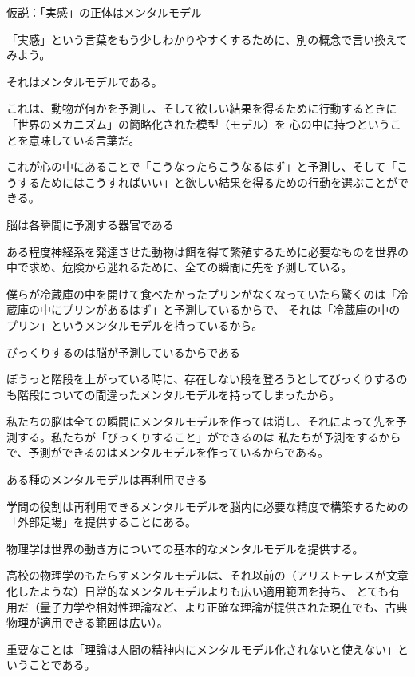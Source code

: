 \documentclass[12pt, unicode]{beamer}
\begin{document}
\begin{frame}{仮説：「実感」の正体はメンタルモデル}

「実感」という言葉をもう少しわかりやすくするために、別の概念で言い換えてみよう。

それはメンタルモデルである。

これは、動物が何かを予測し、そして欲しい結果を得るために行動するときに「世界のメカニズム」の簡略化された模型（モデル）を
心の中に持つということを意味している言葉だ。

これが心の中にあることで「こうなったらこうなるはず」と予測し、そして「こうするためにはこうすればいい」と欲しい結果を得るための行動を選ぶことができる。

\end{frame}

\begin{frame}{脳は各瞬間に予測する器官である}

ある程度神経系を発達させた動物は餌を得て繁殖するために必要なものを世界の中で求め、危険から逃れるために、全ての瞬間に先を予測している。

僕らが冷蔵庫の中を開けて食べたかったプリンがなくなっていたら驚くのは「冷蔵庫の中にプリンがあるはず」と予測しているからで、
それは「冷蔵庫の中のプリン」というメンタルモデルを持っているから。

\end{frame}

\begin{frame}{びっくりするのは脳が予測しているからである}

ぼうっと階段を上がっている時に、存在しない段を登ろうとしてびっくりするのも階段についての間違ったメンタルモデルを持ってしまったから。

私たちの脳は全ての瞬間にメンタルモデルを作っては消し、それによって先を予測する。私たちが「びっくりすること」ができるのは
私たちが予測をするからで、予測ができるのはメンタルモデルを作っているからである。

\end{frame}

\begin{frame}{ある種のメンタルモデルは再利用できる}

学問の役割は再利用できるメンタルモデルを脳内に必要な精度で構築するための「外部足場」を提供することにある。

物理学は世界の動き方についての基本的なメンタルモデルを提供する。

高校の物理学のもたらすメンタルモデルは、それ以前の（アリストテレスが文章化したような）日常的なメンタルモデルよりも広い適用範囲を持ち、
とても有用だ（量子力学や相対性理論など、より正確な理論が提供された現在でも、古典物理が適用できる範囲は広い）。

重要なことは「理論は人間の精神内にメンタルモデル化されないと使えない」ということである。

\end{frame}
\end{document}
